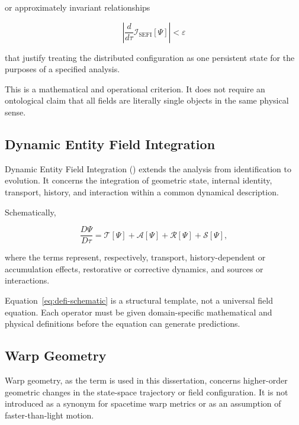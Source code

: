 \documentclass[12pt,oneside]{book}
\newcommand{\SEFI}{\mathrm{SEFI}}
\newcommand{\DEFI}{\mathrm{DEFI}}
\begin{document}
or approximately invariant relationships

\begin{equation}
    \left|
        \frac{d}{d\tau}
        \mathcal{I}_{\SEFI}[\Psi]
    \right|
    <
    \varepsilon
    \label{eq:sefi-invariance}
\end{equation}

that justify treating the distributed configuration as one
persistent state for the purposes of a specified analysis.

This is a mathematical and operational criterion. It does not
require an ontological claim that all fields are literally
single objects in the same physical sense.

\subsection{Dynamic Entity Field Integration}

Dynamic Entity Field Integration (\DEFI) extends the analysis
from identification to evolution. It concerns the integration
of geometric state, internal identity, transport, history, and
interaction within a common dynamical description.

Schematically,

\begin{equation}
    \frac{D\Psi}{D\tau}
    =
    \mathcal{T}[\Psi]
    +
    \mathcal{A}[\Psi]
    +
    \mathcal{R}[\Psi]
    +
    \mathcal{S}[\Psi],
    \label{eq:defi-schematic}
\end{equation}

where the terms represent, respectively, transport,
history-dependent or accumulation effects, restorative or
corrective dynamics, and sources or interactions.

Equation~\eqref{eq:defi-schematic} is a structural template,
not a universal field equation. Each operator must be given
domain-specific mathematical and physical definitions before
the equation can generate predictions.

\subsection{Warp Geometry}

Warp geometry, as the term is used in this dissertation,
concerns higher-order geometric changes in the state-space
trajectory or field configuration. It is not introduced as a
synonym for spacetime warp metrics or as an assumption of
faster-than-light motion.
\end{document}
